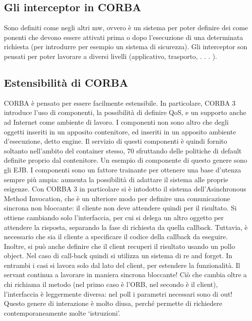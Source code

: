 \subsection{Gli interceptor in CORBA}
Sono definiti come negli altri mw, ovvero è un sistema per poter definire dei come
ponenti che devono essere attivati prima o dopo l'esecuzione di una determinata
richiesta (per introdurre per esempio un sistema di sicurezza). Gli interceptor
son pensati per poter lavorare a diversi livelli (applicativo, trasporto, . . . ).
\subsection{Estensibilità di CORBA}
CORBA è pensato per essere facilmente estensibile. In particolare, CORBA
3 introduce l'uso di componenti, la possibilità di definire QoS, e un supporto
anche ad Internet come ambiente di lavoro.
I componenti non sono altro che degli oggetti inseriti in un apposito contenitore, ed inseriti in un apposito ambiente
d'esecuzione, detto engine. Il servizio
di questi componenti è quindi fornito soltanto nell'ambito del container stesso,
70
sfruttando delle politiche di default definite proprio dal contenitore. Un esempio
di componente di questo genere sono gli EJB.
I componenti sono un fattore trainante per ottenere una base d'utenza sempre più ampia: aumenta la possibilità di
adattare il sistema alle proprie esigenze.
Con CORBA 3 in particolare si è intodotto il sistema dell'Asinchronous
Method Invocation, che è un ulteriore modo per definire una comunicazione
sincrona non bloccante: il cliente non deve attendere quindi per il risultato.
Si ottiene cambiando solo l'interfaccia, per cui si delega un altro oggetto per
attendere la risposta, separando la fase di richiesta da quella callback. Tuttavia,
è necessario che sia il cliente a specificare il codice della callback da eseguire.
Inoltre, si può anche definire che il client recuperi il risultato usando un pollo
object. Nel caso di call-back quindi si utilizza un sistema di re and forget. In
entrambi i casi si lavora solo dal lato del client, per estendere la funzionalità.
Il servant continua a lavorare in maniera sincrona bloccante! Ciò che cambia
oltre a chi richiama il metodo (nel primo caso è l'ORB, nel secondo è il client),
l'interfaccia è leggermente diversa: nel poll i parametri necessari sono di out!
Questo genere di interazione è molto diusa, perché permette di richiedere
contemporaneamente molte {`}istruzioni'.
